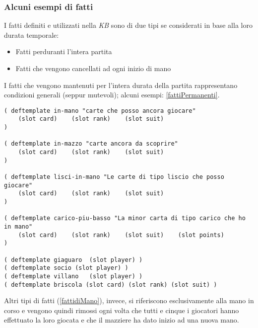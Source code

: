 \subsubsection*{Alcuni esempi di fatti}


I fatti definiti e utilizzati nella \emph{KB} sono di due tipi se considerati in base alla loro durata temporale:
\begin{itemize}
   \item Fatti perduranti l'intera partita
   \item Fatti che vengono cancellati ad ogni inizio di mano
\end{itemize}
I fatti che vengono mantenuti per l'intera durata della partita rappresentano condizioni generali (seppur mutevoli); alcuni esempi: \ref{fattiPermanenti}.



\begin{lstlisting}[caption={Alcuni template di fatti che rimangono nella \emph{KB} per l'intera partita. Il contenuto di questi fatti viene aggiornato mano a mano che nuove informazioni si rendono disponibili all'agente giocatore}, label=fattiPermanenti]
( deftemplate in-mano "carte che posso ancora giocare"
    (slot card)    (slot rank)    (slot suit)
)

( deftemplate in-mazzo "carte ancora da scoprire"
    (slot card)    (slot rank)    (slot suit)
)

( deftemplate lisci-in-mano "Le carte di tipo liscio che posso giocare"
    (slot card)    (slot rank)    (slot suit)
)

( deftemplate carico-piu-basso "La minor carta di tipo carico che ho in mano"
    (slot card)    (slot rank)    (slot suit)    (slot points)
)

( deftemplate giaguaro  (slot player) )
( deftemplate socio (slot player) )
( deftemplate villano   (slot player) )
( deftemplate briscola (slot card) (slot rank) (slot suit) )
\end{lstlisting}




Altri tipi di fatti (\ref{fattidiMano}), invece, si riferiscono esclusivamente alla mano in corso e vengono quindi rimossi ogni volta che tutti e cinque i giocatori hanno effettuato la loro giocata e che il mazziere ha dato inizio ad una nuova mano.

